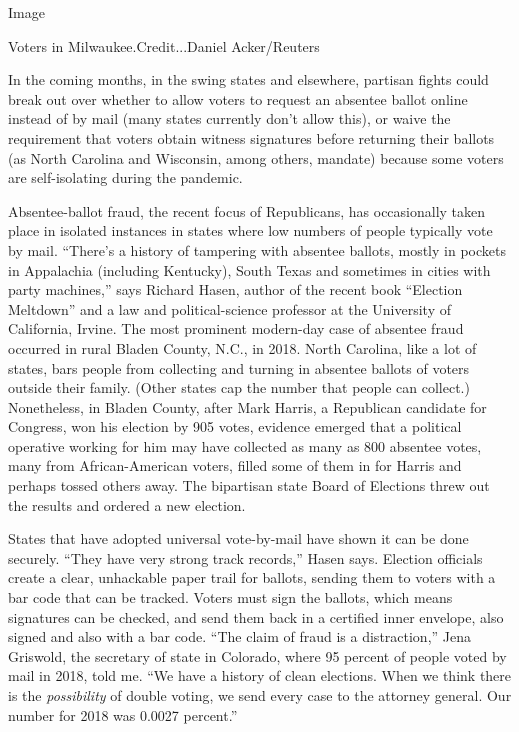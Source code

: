 Image

Voters in Milwaukee.Credit...Daniel Acker/Reuters

In the coming months, in the swing states and elsewhere, partisan fights
could break out over whether to allow voters to request an absentee
ballot online instead of by mail (many states currently don't allow
this), or waive the requirement that voters obtain witness signatures
before returning their ballots (as North Carolina and Wisconsin, among
others, mandate) because some voters are self-isolating during the
pandemic.

Absentee-ballot fraud, the recent focus of Republicans, has occasionally
taken place in isolated instances in states where low numbers of people
typically vote by mail. ``There's a history of tampering with absentee
ballots, mostly in pockets in Appalachia (including Kentucky), South
Texas and sometimes in cities with party machines,'' says Richard Hasen,
author of the recent book ``Election Meltdown'' and a law and
political-science professor at the University of California, Irvine. The
most prominent modern-day case of absentee fraud occurred in rural
Bladen County, N.C., in 2018. North Carolina, like a lot of states, bars
people from collecting and turning in absentee ballots of voters outside
their family. (Other states cap the number that people can collect.)
Nonetheless, in Bladen County, after Mark Harris, a Republican candidate
for Congress, won his election by 905 votes, evidence emerged that a
political operative working for him may have collected as many as 800
absentee votes, many from African-American voters, filled some of them
in for Harris and perhaps tossed others away. The bipartisan state Board
of Elections threw out the results and ordered a new election.

States that have adopted universal vote-by-mail have shown it can be
done securely. ``They have very strong track records,'' Hasen says.
Election officials create a clear, unhackable paper trail for ballots,
sending them to voters with a bar code that can be tracked. Voters must
sign the ballots, which means signatures can be checked, and send them
back in a certified inner envelope, also signed and also with a bar
code. ``The claim of fraud is a distraction,'' Jena Griswold, the
secretary of state in Colorado, where 95 percent of people voted by mail
in 2018, told me. ``We have a history of clean elections. When we think
there is the \emph{possibility} of double voting, we send every case to
the attorney general. Our number for 2018 was 0.0027 percent.''

